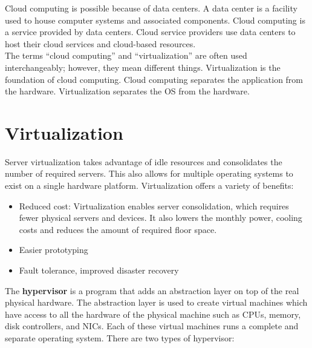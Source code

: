 Cloud computing is possible because of data centers. A data center is a facility used to house computer systems and associated components. Cloud computing is a service provided by data centers. Cloud service providers use data centers to host their cloud services and cloud-based resources.\\

The terms ``cloud computing'' and ``virtualization'' are often used interchangeably; however, they mean different things. Virtualization is the foundation of cloud computing. Cloud computing separates the application from the hardware. Virtualization separates the OS from the hardware. 

\section{Virtualization}

Server virtualization takes advantage of idle resources and consolidates the number of required servers. This also allows for multiple operating systems to exist on a single hardware platform. Virtualization offers a variety of benefits:

\begin{itemize}
\item Reduced cost: Virtualization enables server consolidation, which requires fewer physical servers and devices. It also lowers the monthly power, cooling costs and reduces the amount of required floor space.

\item Easier prototyping

\item Fault tolerance, improved disaster recovery
\end{itemize}

The \textbf{hypervisor} is a program that adds an abstraction layer on top of the real physical hardware. The abstraction layer is used to create virtual machines which have access to all the hardware of the physical machine such as CPUs, memory, disk controllers, and NICs. Each of these virtual machines runs a complete and separate operating system. There are two types of hypervisor:

